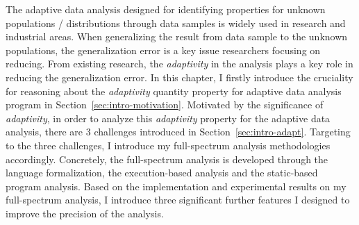 The adaptive data analysis designed for identifying  properties for unknown populations / distributions 
through data samples is widely 
used in research and industrial areas.
When generalizing the result from data sample to the unknown populations, 
the generalization error is a key issue researchers focusing on reducing.
From existing research, the \emph{adaptivity} in the analysis plays a key role in reducing the generalization error.
In this chapter, 
I firstly introduce the  cruciality for reasoning about the \emph{adaptivity} quantity property 
for adaptive data analysis program in Section~\ref{sec:intro-motivation}.
Motivated by the significance of \emph{adaptivity},
in order to analyze this \emph{adaptivity} property for the adaptive data analysis, there are 3 challenges
introduced in Section~\ref{sec:intro-adapt}.
Targeting to the three challenges, I introduce my full-spectrum analysis methodologies accordingly.
Concretely, the full-spectrum analysis is developed through the language formalization,
the execution-based analysis and the static-based program analysis.
%
Based on the implementation and experimental results on my full-spectrum analysis, 
I introduce three significant 
further features I designed to improve the precision of the analysis.
%
